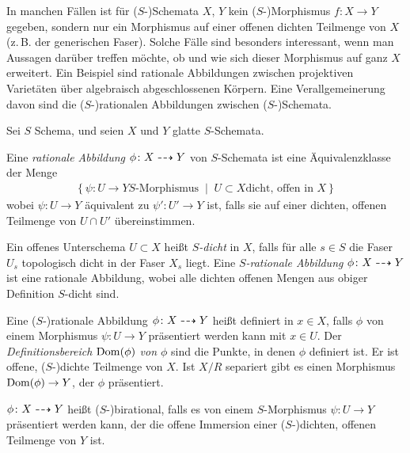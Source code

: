 \documentclass[german, bibliography=totoc]{scrreprt}
\renewcommand*{\optcite}[2][]{}
\begin{document}
In manchen Fällen ist für ($S$-)Schemata $X$, $Y$ kein
($S$-)Morphismus $f\colon X\to Y$ gegeben, sondern nur ein Morphismus
auf einer offenen dichten Teilmenge von $X$ (z.\,B. der generischen
Faser). Solche Fälle sind besonders interessant, wenn man Aussagen
darüber treffen möchte, ob und wie sich dieser Morphismus auf ganz $X$
erweitert. Ein Beispiel sind rationale Abbildungen zwischen
projektiven Varietäten über algebraisch abgeschlossenen Körpern.
Eine Verallgemeinerung davon sind die ($S$-)rationalen Abbildungen
zwischen ($S$-)Schemata.
\begin{Definition}\label{def:ratabb}
  \optcite[Chapter 2.5]{neron}
  Sei $S$ Schema, und seien $X$ und $Y$ glatte $S$-Schemata.

  Eine \emph{rationale Abbildung} $\phi\colon X\dashrightarrow Y$ von
  $S$-Schemata ist eine Äquivalenzklasse der Menge
  \begin{gather*}
    \left\{
      \psi\colon U\to Y \text{$S$-Morphismus}
      \;\middle|\;
      U\subset X \text{dicht, offen in $X$}
    \right\}
  \end{gather*}
  wobei $\psi\colon U\to Y$ äquivalent zu $\psi'\colon U'\to Y$ ist,
  falls sie auf einer dichten, offenen Teilmenge von $U\cap U'$
  übereinstimmen.
  
  Ein offenes Unterschema $U\subset X$ heißt \emph{$S$-dicht} in $X$,
  falls für alle $s\in S$ die Faser $U_s$%
  topologisch dicht in der Faser $X_s$%
  liegt.
  Eine \emph{$S$-rationale Abbildung} $\phi\colon X\dashrightarrow Y$ ist eine
  rationale Abbildung, wobei alle dichten offenen Mengen aus obiger
  Definition $S$-dicht sind.

  Eine ($S$-)rationale Abbildung $\phi\colon X\dashrightarrow Y$ heißt definiert
  in $x\in X$, falls $\phi$ von einem Morphismus $\psi\colon U\to Y$
  präsentiert werden kann mit $x\in U$.
  Der \emph{Definitionsbereich $\operatorname{Dom}(\phi)$ von $\phi$} sind die
  Punkte, in denen $\phi$ definiert ist. Er ist offene, ($S$-)dichte
  Teilmenge von $X$. Ist $X/R$ separiert gibt es einen Morphismus
  $\operatorname{Dom}(\phi)\to Y$, der $\phi$ präsentiert.
  
  $\phi\colon X\dashrightarrow Y$ heißt ($S$-)birational, falls es von einem
  $S$-Morphismus $\psi\colon U\to Y$ präsentiert werden kann, der
  die offene Immersion einer ($S$-)dichten, offenen Teilmenge von $Y$
  ist.
\end{Definition}
\end{document}
